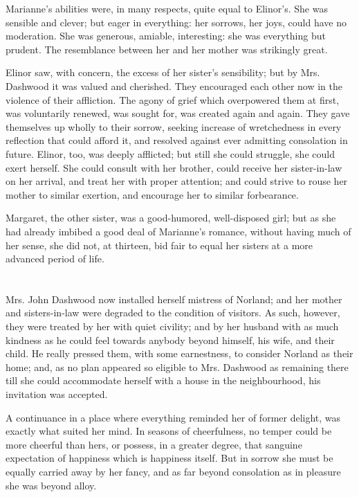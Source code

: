 Marianne's abilities were, in many respects, quite equal to Elinor's. She was sensible and clever; but eager in everything: her sorrows, her joys, could have no moderation. She was generous, amiable, interesting: she was everything but prudent. The resemblance between her and her mother was strikingly great.

Elinor saw, with concern, the excess of her sister's sensibility; but by Mrs. Dashwood it was valued and cherished. They encouraged each other now in the violence of their affliction. The agony of grief which overpowered them at first, was voluntarily renewed, was sought for, was created again and again. They gave themselves up wholly to their sorrow, seeking increase of wretchedness in every reflection that could afford it, and resolved against ever admitting consolation in future. Elinor, too, was deeply afflicted; but still she could struggle, she could exert herself. She could consult with her brother, could receive her sister-in-law on her arrival, and treat her with proper attention; and could strive to rouse her mother to similar exertion, and encourage her to similar forbearance.

Margaret, the other sister, was a good-humored, well-disposed girl; but as she had already imbibed a good deal of Marianne's romance, without having much of her sense, she did not, at thirteen, bid fair to equal her sisters at a more advanced period of life.

\chapter{} %

Mrs. John Dashwood now installed herself mistress of Norland; and her mother and sisters-in-law were degraded to the condition of visitors. As such, however, they were treated by her with quiet civility; and by her husband with as much kindness as he could feel towards anybody beyond himself, his wife, and their child. He really pressed them, with some earnestness, to consider Norland as their home; and, as no plan appeared so eligible to Mrs. Dashwood as remaining there till she could accommodate herself with a house in the neighbourhood, his invitation was accepted.

A continuance in a place where everything reminded her of former delight, was exactly what suited her mind. In seasons of cheerfulness, no temper could be more cheerful than hers, or possess, in a greater degree, that sanguine expectation of happiness which is happiness itself. But in sorrow she must be equally carried away by her fancy, and as far beyond consolation as in pleasure she was beyond alloy.

